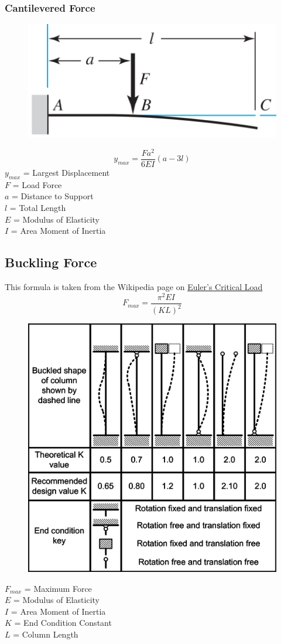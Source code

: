 \documentclass[11pt,a4paper,titlepage]{article}
\begin{document}
	\subsubsection{Cantilevered Force}
	\begin{figure}[H]
		\centering
		\includegraphics[width=0.7\linewidth]{"Cantilievered_Force"}
	\end{figure}
	
	\begin{equation}
		y_{max} = \frac{F a^2}{6 EI} (a-3l)
	\end{equation}
	$y_{max}$ = Largest Displacement \\
	$F$ = Load Force \\
	$a$ = Distance to Support \\
	$l$ = Total Length \\
	$E$ = Modulus of Elasticity \\
	$I$ = Area Moment of Inertia
	
	\newpage
	\subsection{Buckling Force}
	This formula is taken from the Wikipedia page on  \href{https://en.wikipedia.org/wiki/Euler\%27s_critical_load}{Euler's Critical Load}
	\begin{equation}
		F_{max} = \frac{\pi^2 EI}{(KL)^2}
	\end{equation}
	\begin{figure}[H]
		\centering
		\includegraphics[width=0.5\linewidth]{"ColumnEffectiveLength"}
	\end{figure}
	$F_{max}$ = Maximum Force \\
	$E$ = Modulus of Elasticity \\
	$I$ = Area Moment of Inertia \\
	$K$ = End Condition Constant \\
	$L$ = Column Length
	
\end{document}
